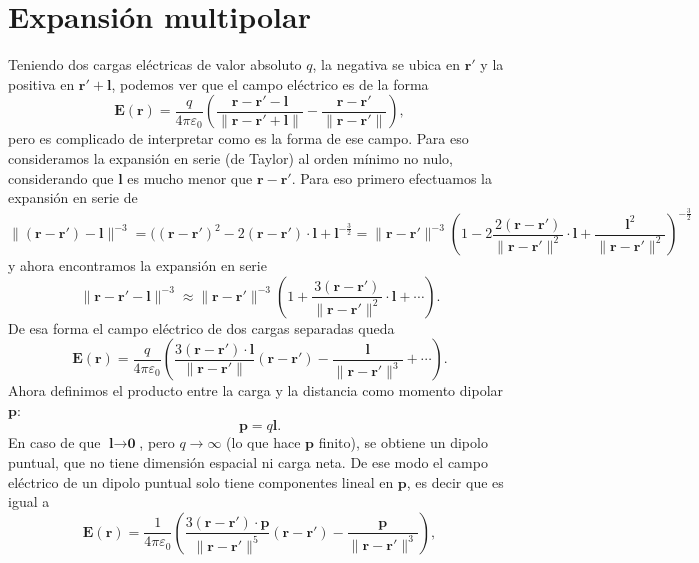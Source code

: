 \documentclass[11pt,a4paper]{article}
\numberwithin{equation}{section}
\begin{document}
\section{Expansión multipolar}
\label{sec:e_multipolar}
Teniendo dos cargas eléctricas de valor absoluto $q$, la negativa se ubica en $\textbf{r}'$ y la positiva en $\textbf{r}' + \textbf{l}$, podemos ver que el campo eléctrico es de la forma \[\textbf{E}(\textbf{r}) = \frac{q}{4\pi\varepsilon_0} \left( \frac{\textbf{r} -  \textbf{r}' - \textbf{l}}{\|\textbf{r} - \textbf{r}' + \textbf{l}\|} - \frac{ \textbf{r} - \textbf{r}'}{\| \textbf{r} - \textbf{r}'\|} \right),\] pero es complicado de interpretar como es la forma de ese campo. Para eso consideramos la expansión en serie (de Taylor) al orden mínimo no nulo, considerando que $\textbf{l}$ es mucho menor que $\textbf{r} - \textbf{r}'$. Para eso primero efectuamos la expansión en serie de \[\|(\textbf{r} - \textbf{r}') - \textbf{l}\|^{-3} = ((\textbf{r} - \textbf{r}')^2 - 2 (\textbf{r} - \textbf{r}') \cdot \textbf{l} + \textbf{l}^{-\frac{3}{2}} = \|\textbf{r} - \textbf{r}'\|^{-3} \left(1 - 2 \frac{2(\textbf{r} - \textbf{r}')}{\|\textbf{r} - \textbf{r}'\|^2} \cdot \textbf{l} + \frac{\textbf{l}^2}{\|\textbf{r} - \textbf{r}'\|^2}\right)^{-\frac{3}{2}}\] y  ahora encontramos la expansión en serie \[\|\textbf{r} - \textbf{r}' - \textbf{l}\|^{-3} \approx \|\textbf{r} - \textbf{r}'\|^{-3} \left(1 + \frac{3 (\textbf{r} - \textbf{r}')}{\|\textbf{r} - \textbf{r}'\|^2} \cdot  \textbf{l} + \cdots  \right).\] De esa forma el campo eléctrico de dos cargas separadas queda
\begin{equation}
    \textbf{E}(\textbf{r}) = \frac{q}{4\pi\varepsilon_0} \left(\frac{3 (\textbf{r} - \textbf{r}') \cdot \textbf{l}}{\|\textbf{r} - \textbf{r}'\|} (\textbf{r} - \textbf{r}') - \frac{\textbf{l}}{\|\textbf{r} - \textbf{r}'\|^3} + \cdots \right).
    \label{eq:e_campo_dipolo_real}
\end{equation}
Ahora definimos el producto entre la carga y la distancia como momento dipolar $\textbf{p}$:
\begin{equation}
    \textbf{p} = q\textbf{l}.
    \label{eq:e_dipolo}
\end{equation}
En caso de que $\textbf{l} \to \textbf{0}$, pero $q \to \infty$ (lo que hace $\textbf{p}$ finito), se obtiene un dipolo puntual, que no tiene dimensión espacial ni carga neta. De ese modo el campo eléctrico de un dipolo puntual solo tiene componentes lineal en $\textbf{p}$, es decir que es igual a
\begin{equation}
    \textbf{E}(\textbf{r}) = \frac{1}{4\pi\varepsilon_0} \left(\frac{3 (\textbf{r} - \textbf{r}') \cdot \textbf{p}}{\|\textbf{r} - \textbf{r}'\|^5}(\textbf{r} - \textbf{r}') - \frac{\textbf{p}}{\|\textbf{r} - \textbf{r}'\|^3}\right),
    \label{eq:e_dipolo_puntal}
\end{equation}
\end{document}
